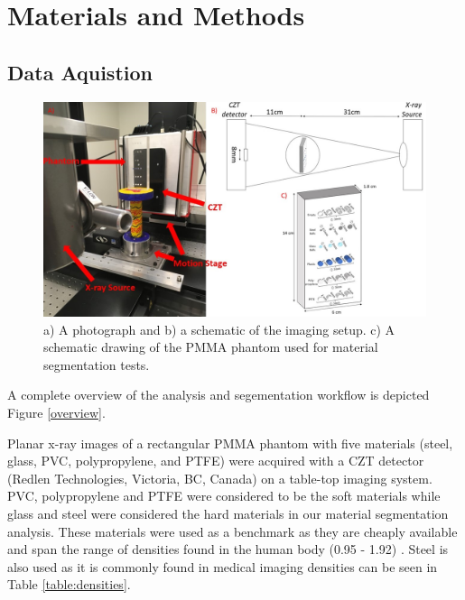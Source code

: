 \documentclass[a4paper,11pt]{article}
\begin{document}

\section{Materials and Methods}
\label{sec:methods}


\subsection{Data Aquistion}

\begin{figure}[htbp]


\includegraphics[width=\textwidth]{FullFigure.jpg}

  
  \caption{a) A photograph and b) a schematic of the imaging setup. c) A schematic drawing of the PMMA phantom used for material segmentation tests.}
  \label{figure:setup}
\end{figure}

A complete overview of the analysis and segementation workflow is depicted Figure \ref{overview}.

Planar x-ray images of a rectangular PMMA phantom with five materials (steel, glass, PVC, polypropylene, and PTFE) were acquired with a CZT detector (Redlen Technologies, Victoria, BC, Canada) on a table-top imaging system. PVC, polypropylene and PTFE were considered to be the soft materials while glass and steel were considered the hard materials in our material segmentation analysis. These materials were used as a benchmark as they are cheaply available and span the range of densities found in the human body (0.95 - 1.92) \cite{White1989Report44}. Steel is also used as it is commonly found in medical imaging densities can be seen in Table \ref{table:densities}. 
\end{document}
